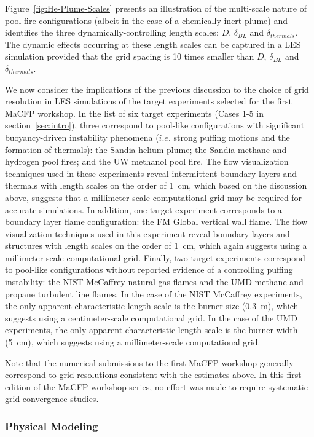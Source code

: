 Figure~\ref{fig:He-Plume-Scales} presents an illustration of the multi-scale nature of pool fire configurations (albeit in the case of a chemically inert plume) and identifies the three dynamically-controlling length scales: $D$, $\delta_{BL}$ and $\delta_{thermals}$. The dynamic effects occurring at these length scales can be captured in a LES simulation provided that the grid spacing is 10 times smaller than $D$, $\delta_{BL}$ and $\delta_{thermals}$.

We now consider the implications of the previous discussion to the choice of grid resolution in LES simulations of the target experiments selected for the first MaCFP workshop. In the list of six target experiments (Cases 1-5 in section~\ref{sec:intro}), three correspond to pool-like configurations with significant buoyancy-driven instability phenomena ($i.e.$ strong puffing motions and the formation of thermals): the Sandia helium plume; the Sandia methane and hydrogen pool fires; and the UW methanol pool fire. The flow visualization techniques used in these experiments reveal intermittent boundary layers and thermals with length scales on the order of 1~cm, which based on the discussion above, suggests that a millimeter-scale computational grid may be required for accurate simulations. In addition, one target experiment corresponds to a boundary layer flame configuration: the FM Global vertical wall flame. The flow visualization techniques used in this experiment reveal boundary layers and structures with length scales on the order of 1~cm, which again suggests using a millimeter-scale computational grid. Finally, two target experiments correspond to pool-like configurations without reported evidence of a controlling puffing instability: the NIST McCaffrey natural gas flames and the UMD methane and propane turbulent line flames. In the case of the NIST McCaffrey experiments, the only apparent characteristic length scale is the burner size (0.3~m), which suggests using a centimeter-scale computational grid. In the case of the UMD experiments, the only apparent characteristic length scale is the burner width (5~cm), which suggests using a millimeter-scale computational grid.

Note that the numerical submissions to the first MaCFP workshop generally correspond to grid resolutions consistent with the estimates above. In this first edition of the MaCFP workshop series, no effort was made to require systematic grid convergence studies.

\subsubsection{Physical Modeling}
\label{sec:PM}

